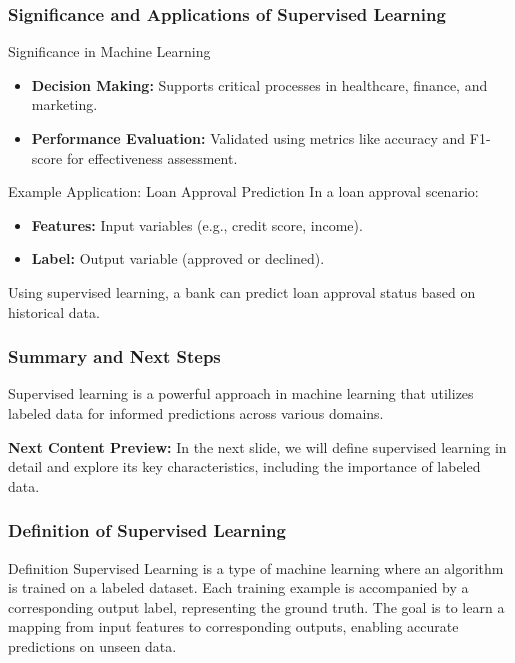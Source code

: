 \documentclass[aspectratio=169]{beamer}
\begin{document}
\begin{frame}[fragile]
    \frametitle{Significance and Applications of Supervised Learning}
    \begin{block}{Significance in Machine Learning}
        \begin{itemize}
            \item \textbf{Decision Making:} Supports critical processes in healthcare, finance, and marketing.
            \item \textbf{Performance Evaluation:} Validated using metrics like accuracy and F1-score for effectiveness assessment.
        \end{itemize}
    \end{block}

    \begin{block}{Example Application: Loan Approval Prediction}
        In a loan approval scenario:
        \begin{itemize}
            \item \textbf{Features:} Input variables (e.g., credit score, income).
            \item \textbf{Label:} Output variable (approved or declined).
        \end{itemize}
        Using supervised learning, a bank can predict loan approval status based on historical data.
    \end{block}
\end{frame}

\begin{frame}[fragile]
    \frametitle{Summary and Next Steps}
    Supervised learning is a powerful approach in machine learning that utilizes labeled data for informed predictions across various domains.

    \vspace{1em}
    \textbf{Next Content Preview:} 
    In the next slide, we will define supervised learning in detail and explore its key characteristics, including the importance of labeled data.
\end{frame}

\begin{frame}[fragile]
    \frametitle{Definition of Supervised Learning}
    \begin{block}{Definition}
        Supervised Learning is a type of machine learning where an algorithm is trained on a labeled dataset. Each training example is accompanied by a corresponding output label, representing the ground truth. The goal is to learn a mapping from input features to corresponding outputs, enabling accurate predictions on unseen data.
    \end{block}
\end{frame}
\end{document}
